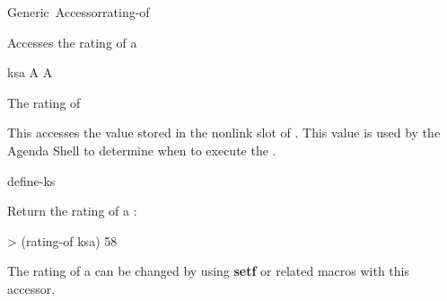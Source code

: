 \documentclass[10pt,twoside,english,pdftex]{article}
\begin{document}
\begin{functiondoc}{Generic~Accessor}{rating-of}{ 
    \returns{} }
%

\fnsyntax

\fnpurpose Accesses the rating of a 

\fnsetf
{}

\fnmethods
{}

\fnpackage {}

\fnmodule {}

\fnargs
\begin{args}{ksa}
\arg[ksa] A 
\arg[rating] A 
\end{args}

\fnreturns The rating of 
  
\fndescription 
This  accesses the value stored in the
 nonlink slot of .  This value is used by the
Agenda Shell to determine when to execute the .

\begin{alsos}{define-ks}
\also[define-ks]
\also[ks]
\also[ksa]
\end{alsos}

\fnexample
Return the rating of a :
\begin{example}
> (rating-of ksa)
58
\end{example}

\fnnote 
The rating of a  can be changed by using {\bf setf} or
related macros with this accessor.

\end{functiondoc}

\end{document}
